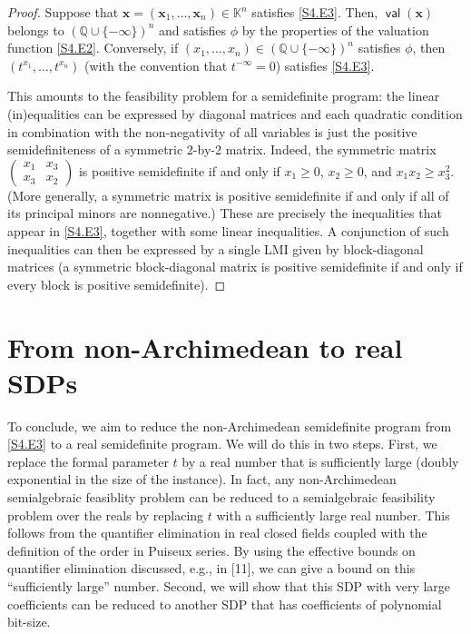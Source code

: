 \begin{proof}
Suppose that $\bm{x}=(\bm{x}_{1},\dots,\bm{x}_{n})\in\mathbb{K}^{n}$ satisfies \eqref{S4.E3}. Then, $\operatorname*{\mathsf{val}}(\bm{x})$ belongs to $(\mathbb{Q}\cup\{-\infty\})^{n}$ and satisfies $\phi$ by the properties of the valuation function \eqref{S4.E2}. Conversely, if $(x_{1},\dots,x_{n})\in(\mathbb{Q}\cup\{-\infty\})^{n}$ satisfies $\phi$, then $(t^{x_{1}},\dots,t^{x_{n}})$ (with the convention that $t^{-\infty}=0$) satisfies \eqref{S4.E3}.

This amounts to the feasibility problem for a semidefinite program: the linear (in)equalities can be expressed by diagonal matrices and each quadratic condition in combination with the non-negativity of all variables is just the positive semidefiniteness of a symmetric 2-by-2 matrix. Indeed, the symmetric matrix $\begin{pmatrix}x_{1}&x_{3}\\ x_{3}&x_{2}\end{pmatrix}$ is positive semidefinite if and only if $x_{1}\geq 0$, $x_{2}\geq 0$, and $x_{1}x_{2}\geq x_{3}^{2}$. (More generally, a symmetric matrix is positive semidefinite if and only if all of its principal minors are nonnegative.) These are precisely the inequalities that appear in \eqref{S4.E3}, together with some linear inequalities. A conjunction of such inequalities can then be expressed by a single LMI given by block-diagonal matrices (a symmetric block-diagonal matrix is positive semidefinite if and only if every block is positive semidefinite). 

\end{proof}

\section*{From non-Archimedean to real SDPs}

To conclude, we aim to reduce the non-Archimedean semidefinite program from \eqref{S4.E3} to a real semidefinite program. We will do this in two steps. First, we replace the formal parameter $t$ by a real number that is sufficiently large (doubly exponential in the size of the instance). In fact, any non-Archimedean semialgebraic feasiblity problem can be reduced to a semialgebraic feasibility problem over the reals by replacing $t$ with a sufficiently large real number. This follows from the quantifier elimination in real closed fields coupled with the definition of the order in Puiseux series. By using the effective bounds on quantifier elimination discussed, e.g., in [11], we can give a bound on this “sufficiently large” number. Second, we will show that this SDP with very large coefficients can be reduced to another SDP that has coefficients of polynomial bit-size.

